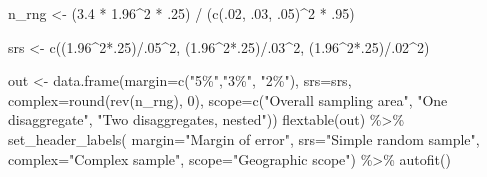 \documentclass[
  letterpaper,
  DIV=11,
  numbers=noendperiod]{scrreprt}
\newenvironment{Shaded}{\begin{snugshade}}{\end{snugshade}}
\newcommand{\AttributeTok}[1]{\textcolor[rgb]{0.40,0.45,0.13}{#1}}
\newcommand{\DecValTok}[1]{\textcolor[rgb]{0.68,0.00,0.00}{#1}}
\newcommand{\FloatTok}[1]{\textcolor[rgb]{0.68,0.00,0.00}{#1}}
\newcommand{\FunctionTok}[1]{\textcolor[rgb]{0.28,0.35,0.67}{#1}}
\newcommand{\NormalTok}[1]{\textcolor[rgb]{0.00,0.23,0.31}{#1}}
\newcommand{\OtherTok}[1]{\textcolor[rgb]{0.00,0.23,0.31}{#1}}
\newcommand{\SpecialCharTok}[1]{\textcolor[rgb]{0.37,0.37,0.37}{#1}}
\newcommand{\StringTok}[1]{\textcolor[rgb]{0.13,0.47,0.30}{#1}}
\begin{document}
\begin{Shaded}
\begin{Highlighting}[]
\NormalTok{n\_rng }\OtherTok{\textless{}{-}}\NormalTok{ (}\FloatTok{3.4} \SpecialCharTok{*} \FloatTok{1.96}\SpecialCharTok{\^{}}\DecValTok{2} \SpecialCharTok{*}\NormalTok{ .}\DecValTok{25}\NormalTok{) }\SpecialCharTok{/}\NormalTok{ (}\FunctionTok{c}\NormalTok{(.}\DecValTok{02}\NormalTok{, .}\DecValTok{03}\NormalTok{, .}\DecValTok{05}\NormalTok{)}\SpecialCharTok{\^{}}\DecValTok{2} \SpecialCharTok{*}\NormalTok{ .}\DecValTok{95}\NormalTok{)}

\NormalTok{srs }\OtherTok{\textless{}{-}} \FunctionTok{c}\NormalTok{((}\FloatTok{1.96}\SpecialCharTok{\^{}}\DecValTok{2}\SpecialCharTok{*}\NormalTok{.}\DecValTok{25}\NormalTok{)}\SpecialCharTok{/}\NormalTok{.}\DecValTok{05}\SpecialCharTok{\^{}}\DecValTok{2}\NormalTok{,}
\NormalTok{         (}\FloatTok{1.96}\SpecialCharTok{\^{}}\DecValTok{2}\SpecialCharTok{*}\NormalTok{.}\DecValTok{25}\NormalTok{)}\SpecialCharTok{/}\NormalTok{.}\DecValTok{03}\SpecialCharTok{\^{}}\DecValTok{2}\NormalTok{,}
\NormalTok{          (}\FloatTok{1.96}\SpecialCharTok{\^{}}\DecValTok{2}\SpecialCharTok{*}\NormalTok{.}\DecValTok{25}\NormalTok{)}\SpecialCharTok{/}\NormalTok{.}\DecValTok{02}\SpecialCharTok{\^{}}\DecValTok{2}\NormalTok{)}


\NormalTok{out }\OtherTok{\textless{}{-}} \FunctionTok{data.frame}\NormalTok{(}\AttributeTok{margin=}\FunctionTok{c}\NormalTok{(}\StringTok{"5\%"}\NormalTok{,}\StringTok{"3\%"}\NormalTok{, }\StringTok{"2\%"}\NormalTok{),}
                  \AttributeTok{srs=}\NormalTok{srs,}
                  \AttributeTok{complex=}\FunctionTok{round}\NormalTok{(}\FunctionTok{rev}\NormalTok{(n\_rng), }\DecValTok{0}\NormalTok{),}
                  \AttributeTok{scope=}\FunctionTok{c}\NormalTok{(}\StringTok{"Overall sampling area"}\NormalTok{, }\StringTok{"One disaggregate"}\NormalTok{, }\StringTok{"Two disaggregates, nested"}\NormalTok{))}
\FunctionTok{flextable}\NormalTok{(out) }\SpecialCharTok{\%\textgreater{}\%} 
  \FunctionTok{set\_header\_labels}\NormalTok{(}
                    \AttributeTok{margin=}\StringTok{"Margin of error"}\NormalTok{,}
                    \AttributeTok{srs=}\StringTok{"Simple random sample"}\NormalTok{,}
                    \AttributeTok{complex=}\StringTok{"Complex sample"}\NormalTok{,}
                    \AttributeTok{scope=}\StringTok{"Geographic scope"}\NormalTok{) }\SpecialCharTok{\%\textgreater{}\%}
  \FunctionTok{autofit}\NormalTok{() }
\end{Highlighting}
\end{Shaded}
\end{document}
